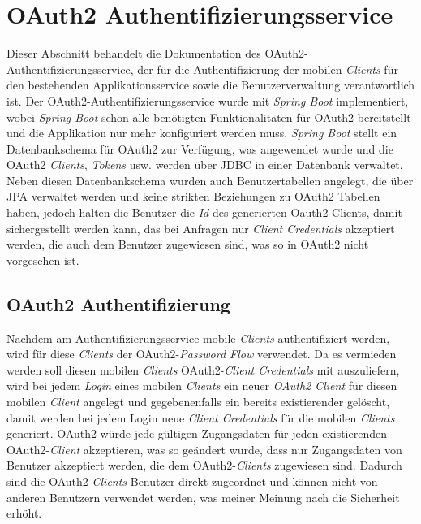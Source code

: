 \documentclass[]{article}
\begin{document}
{{{{\section{OAuth2 Authentifizierungsservice}
Dieser Abschnitt behandelt die Dokumentation des OAuth2-Authentifizierungsservice, der für die Authentifizierung der mobilen \emph{Clients} für den bestehenden Applikationsservice sowie die Benutzerverwaltung verantwortlich ist. Der OAuth2-Authentifizierungsservice wurde mit \emph{Spring Boot} implementiert, wobei \emph{Spring Boot} schon alle benötigten Funktionalitäten für OAuth2 bereitstellt und die Applikation nur mehr konfiguriert werden muss.
\newline
\newline
\emph{Spring Boot} stellt ein Datenbankschema für OAuth2 zur Verfügung, was angewendet wurde und die OAuth2 \emph{Clients}, \emph{Tokens} usw. werden über JDBC in einer Datenbank verwaltet.
\newline
\newline
Neben diesen Datenbankschema wurden auch Benutzertabellen angelegt, die über JPA verwaltet werden und keine strikten Beziehungen zu OAuth2 Tabellen haben, jedoch halten die Benutzer die \emph{Id} des generierten Oauth2-Clients, damit sichergestellt werden kann, das bei Anfragen nur \emph{Client Credentials} akzeptiert werden, die auch dem Benutzer zugewiesen sind, was so in OAuth2 nicht vorgesehen ist.

\subsection{OAuth2 Authentifizierung}
Nachdem am Authentifizierungsservice mobile \emph{Clients} authentifiziert werden, wird für diese \emph{Clients} der OAuth2-\emph{Password Flow} verwendet. Da es vermieden werden soll diesen mobilen \emph{Clients} OAuth2-\emph{Client Credentials} mit auszuliefern, wird bei jedem \emph{Login} eines mobilen \emph{Clients} ein neuer \emph{OAuth2 Client} für diesen mobilen \emph{Client}  angelegt und gegebenenfalls ein bereits existierender gelöscht, damit werden bei jedem Login neue \emph{Client Credentials} für die mobilen \emph{Clients} generiert.
\newline
\newline
OAuth2 würde jede gültigen Zugangsdaten für jeden existierenden OAuth2-\emph{Client} akzeptieren, was so geändert wurde, dass nur Zugangsdaten von Benutzer akzeptiert werden, die dem OAuth2-\emph{Clients} zugewiesen sind. Dadurch sind die OAuth2-\emph{Clients} Benutzer direkt zugeordnet und können nicht von anderen Benutzern verwendet werden, was meiner Meinung nach die Sicherheit erhöht.

}}}}
\end{document}
